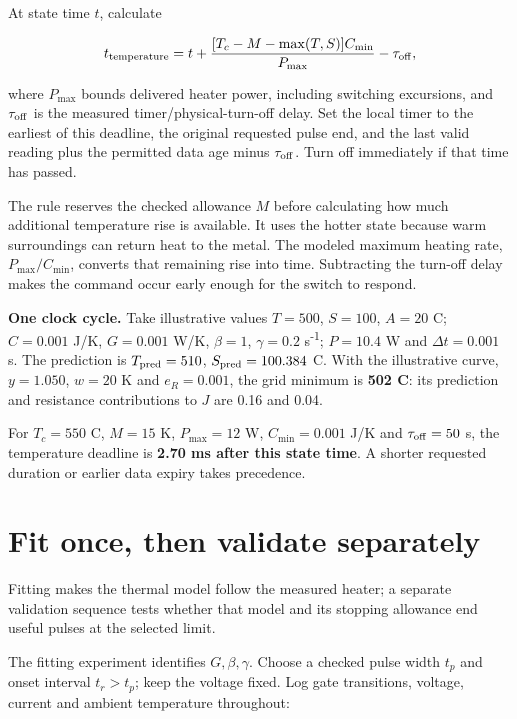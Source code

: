 \documentclass[11pt,letterpaper]{article}
\begin{document}
At state time \(t\), calculate

\[
t_{\rm temperature}=t+
\frac{[T_c-M-\max(T,S)]C_{\min}}{P_{\max}}-\tau_{\rm off},
\]

where \(P_{\max}\) bounds delivered heater power, including switching excursions, and \(\tau_{\rm off}\) is the measured timer/physical-turn-off delay. Set the local timer to the earliest of this deadline, the original requested pulse end, and the last valid reading plus the permitted data age minus \(\tau_{\rm off}\). Turn off immediately if that time has passed.

The rule reserves the checked allowance \(M\) before calculating how much additional temperature rise is available. It uses the hotter state because warm surroundings can return heat to the metal. The modeled maximum heating rate, \(P_{\max}/C_{\min}\), converts that remaining rise into time. Subtracting the turn-off delay makes the command occur early enough for the switch to respond.

\textbf{One clock cycle.} Take illustrative values \(T=500\), \(S=100\), \(A=20\) \textdegree{}C; \(C=0.001\) J/K, \(G=0.001\) W/K, \(\beta=1\), \(\gamma=0.2\) s\textsuperscript{-1}; \(P=10.4\) W and \(\Delta t=0.001\) s. The prediction is \(T_{\rm pred}=510\), \(S_{\rm pred}=100.384\) \textdegree{}C. With the illustrative curve, \(y=1.050\), \(w=20\) K and \(e_R=0.001\), the grid minimum is \textbf{502 \textdegree{}C}: its prediction and resistance contributions to \(J\) are 0.16 and 0.04.

For \(T_c=550\) \textdegree{}C, \(M=15\) K, \(P_{\max}=12\) W, \(C_{\min}=0.001\) J/K and \(\tau_{\rm off}=50\) \textmu{}s, the temperature deadline is \textbf{2.70 ms after this state time}. A shorter requested duration or earlier data expiry takes precedence.

\section{Fit once, then validate separately}

Fitting makes the thermal model follow the measured heater; a separate validation sequence tests whether that model and its stopping allowance end useful pulses at the selected limit.

The fitting experiment identifies \(G,\beta,\gamma\). Choose a checked pulse width \(t_p\) and onset interval \(t_r>t_p\); keep the voltage fixed. Log gate transitions, voltage, current and ambient temperature throughout:
\end{document}
